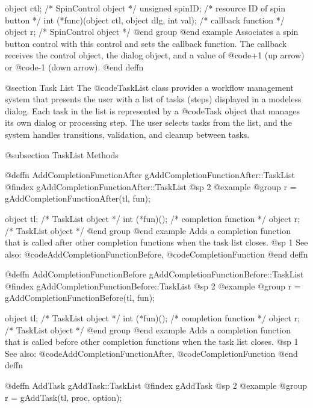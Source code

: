 object    ctl;      /*  SpinControl object               */
unsigned  spinID;   /*  resource ID of spin button        */
int       (*func)(object ctl, object dlg, int val);
                    /*  callback function                 */
object    r;        /*  SpinControl object                */
@end group
@end example
Associates a spin button control with this control and sets the callback
function.  The callback receives the control object, the dialog object,
and a value of @code{+1} (up arrow) or @code{-1} (down arrow).
@end deffn



@section Task List
The @code{TaskList} class provides a workflow management system that
presents the user with a list of tasks (steps) displayed in a modeless
dialog.  Each task in the list is represented by a @code{Task} object
that manages its own dialog or processing step.  The user selects tasks
from the list, and the system handles transitions, validation, and
cleanup between tasks.

@subsection TaskList Methods



@deffn {AddCompletionFunctionAfter} gAddCompletionFunctionAfter::TaskList
@findex gAddCompletionFunctionAfter::TaskList
@sp 2
@example
@group
r = gAddCompletionFunctionAfter(tl, fun);

object  tl;    /*  TaskList object          */
int     (*fun)();  /*  completion function  */
object  r;     /*  TaskList object          */
@end group
@end example
Adds a completion function that is called after other completion
functions when the task list closes.
@sp 1
See also:  @code{AddCompletionFunctionBefore}, @code{CompletionFunction}
@end deffn



@deffn {AddCompletionFunctionBefore} gAddCompletionFunctionBefore::TaskList
@findex gAddCompletionFunctionBefore::TaskList
@sp 2
@example
@group
r = gAddCompletionFunctionBefore(tl, fun);

object  tl;    /*  TaskList object          */
int     (*fun)();  /*  completion function  */
object  r;     /*  TaskList object          */
@end group
@end example
Adds a completion function that is called before other completion
functions when the task list closes.
@sp 1
See also:  @code{AddCompletionFunctionAfter}, @code{CompletionFunction}
@end deffn



@deffn {AddTask} gAddTask::TaskList
@findex gAddTask
@sp 2
@example
@group
r = gAddTask(tl, proc, option);

